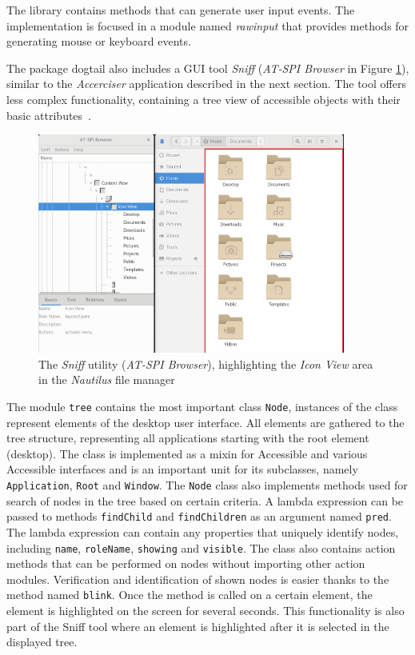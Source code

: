 The library contains methods that can generate user input events. The implementation is focused in a module named \textit{rawinput} that provides methods for generating mouse or keyboard events.

The package dogtail also includes a GUI tool \textit{Sniff} (\textit{AT-SPI Browser} in Figure \ref{sniff}), similar to the \textit{Accerciser} application described in the next section. The tool offers less complex functionality, containing a tree view of accessible objects with their basic attributes~\cite{dogtail_doc}.

\begin{figure}[h]
	\centering
	\includegraphics[width=0.9\textwidth]{obrazky-figures/sniff.png}
	\caption{The \textit{Sniff} utility (\textit{AT-SPI Browser}), highlighting the \textit{Icon View} area in the \textit{Nautilus} file manager}
	\label{sniff}
\end{figure}

The module \texttt{tree} contains the most important class \texttt{Node}, instances of the class represent elements of the desktop user interface. All elements are gathered to the tree structure, representing all applications starting with the root element (desktop). The class is implemented as a mixin for Accessible and various Accessible interfaces and is an important unit for its subclasses, namely \texttt{Application}, \texttt{Root} and \texttt{Window}. The \texttt{Node} class also implements methods used for search of nodes in the tree based on certain criteria. A lambda expression can be passed to methods \texttt{findChild} and \texttt{findChildren} as an argument named \texttt{pred}. The lambda expression can contain any properties that uniquely identify nodes, including \texttt{name}, \texttt{roleName},  \texttt{showing} and \texttt{visible}. The class also contains action methods that can be performed on nodes without importing other action modules. Verification and identification of shown nodes is easier thanks to the method named \texttt{blink}. Once the method is called on a certain element, the element is highlighted on the screen for several seconds. This functionality is also part of the Sniff tool where an element is highlighted after it is selected in the displayed tree.

